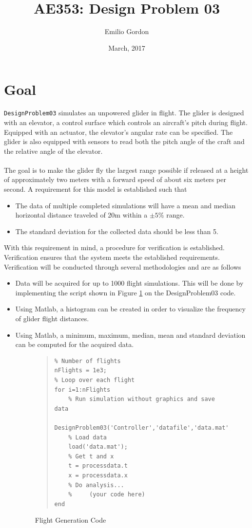 \documentclass[12pt]{article}
\title{AE353: Design Problem 03}
\author{Emilio Gordon}
\date{March, 2017}
\begin{document}
\maketitle


\section{Goal}
\lstinline!DesignProblem03! simulates an unpowered glider in flight. The glider is designed with an elevator, a control surface which controls an aircraft's pitch during flight. Equipped with an actuator, the elevator's angular rate can be specified. The glider is also equipped with sensors to read both the pitch angle of the craft and the relative angle of the elevator. 
\\ \\
The goal is to make the glider fly the largest range possible if released at a height of approximately two meters with a forward speed of about six meters per second. A requirement for this model is established such that
\begin{itemize}
\item The data of multiple completed simulations will have a mean and median horizontal distance traveled of 20m within a $\pm5\%$ range.
\item The standard deviation for the collected data should be less than 5.
\end{itemize}
With this requirement in mind, a procedure for verification is established. Verification ensures that the system meets the established requirements. Verification will be conducted through several methodologies and are as follows
\begin{itemize}
\item Data will be acquired for up to 1000 flight simulations. This will be done by implementing the script shown in Figure \ref{fig:fgc} on the DesignProblem03 code. 
\item Using Matlab, a histogram can be created in order to visualize the frequency of glider flight distances. 
\item Using Matlab, a minimum, maximum, median, mean and standard deviation can be computed for the acquired data.
\begin{figure}[H]
\begin{quote}
\begin{lstlisting}
% Number of flights
nFlights = 1e3;
% Loop over each flight
for i=1:nFlights
    % Run simulation without graphics and save data
    DesignProblem03('Controller','datafile','data.mat','display',false);
    % Load data
    load('data.mat');
    % Get t and x
    t = processdata.t
    x = processdata.x
    % Do analysis...
    %     (your code here)
end
\end{lstlisting}
\end{quote}
\caption{Flight Generation Code\label{fig:fgc}}
\end{figure}
\end{itemize}
\end{document}
